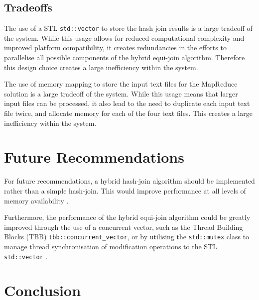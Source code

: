 \documentclass[10pt,twocolumn]{witseiepaper}
\begin{document}
\subsection{Tradeoffs} \label{sec:tradeoffs}
The use of a STL \texttt{std::vector} to store the hash join results is a large tradeoff of the system. While this usage allows for reduced computational complexity and improved platform compatibility, it creates redundancies in the efforts to parallelise all possible components of the hybrid equi-join algorithm. Therefore this design choice creates a large inefficiency within the system.

The use of memory mapping to store the input text files for the MapReduce solution is a large tradeoff of the system. While this usage means that larger input files can be processed, it also lead to the need to duplicate each input text file twice, and allocate memory for each of the four text files. This creates a large inefficiency within the system.

\section{Future Recommendations}
For future recommendations, a hybrid hash-join algorithm should be implemented rather than a simple hash-join. This would improve performance at all levels of memory availability \cite{evaluating4JoinAlgorithms}.

Furthermore, the performance of the hybrid equi-join algorithm could be greatly improved through the use of a concurrent vector, such as the Thread Building Blocks (TBB) \texttt{tbb::concurrent\_vector}, or by utilising the \texttt{std::mutex} class to manage thread synchronisation of modification operations to the STL \texttt{std::vector} \cite{tbb} \cite{mutex}.

\section{Conclusion}



\end{document}
